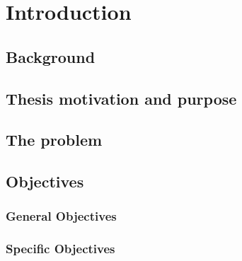 \cleardoublepage
\thispagestyle{empty}
\chapter{Introduction}
\section{Background}
\label{sec:background}

\section{Thesis motivation and purpose}
\label{sec:motivation}


\section{The problem}
\label{sec:problem}

\section{Objectives}
\label{sec:objectives}

\subsection{General Objectives}
\label{sec:gobjectives}
\subsection{Specific Objectives}
\label{sec:sobjectives}


